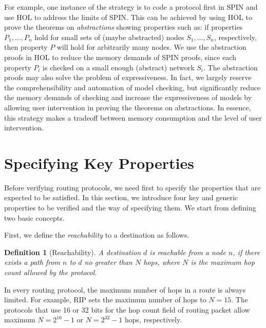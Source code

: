 \documentclass[a4paper,10pt,twocolumn]{article}
\newtheorem{definition}[theorem]{Definition}
\begin{document}
For example, one instance of the strategy is to code a protocol first in SPIN and use HOL to address the limits of SPIN. This can be achieved by using HOL to prove the theorems on \emph{abstractions} showing properties such as: if properties $P_1,...,P_n$ hold for small sets of (maybe abstracted) nodes $S_1,...,S_n$, respectively, then property $P$ will hold for arbitrarily many nodes. We use the abstraction proofs in HOL to reduce the memory demands of SPIN proofs, since each property $P_i$ is checked on a small enough (abstract) network $S_i$. The abstraction proofs may also solve the problem of expressiveness. In fact, we largely reserve the comprehensibility and automation of model checking, but significantly reduce the memory demands of checking and increase the expressiveness of models by allowing user intervention in proving the theorems on abstractions. In essence, this strategy makes a tradeoff between memory consumption and the level of user intervention.

\section{Specifying Key Properties}
\label{Sec:prop}
Before verifying routing protocols, we need first to specify the properties that are expected to be satisfied. In this section, we introduce four key and generic properties to be verified and the way of specifying them. We start from defining two basic concepts.

First, we define the \emph{reachability} to a destination as follows.
\begin{definition}[Reachability]
A destination $d$ is \emph{reachable} from a node $n$, if there exists a path from $n$ to $d$ no greater than $N$ hops, where $N$ is the maximum hop count allowed by the protocol.
\end{definition}
In every routing protocol, the maximum number of hops in a route is always limited. For example, RIP sets the maximum number of hops to $N=15$. The protocols that use 16 or 32 bits for the hop count field of routing packet allow maximum $N=2^{16}-1$ or $N=2^{32}-1$ hops, respectively.
\end{document}
